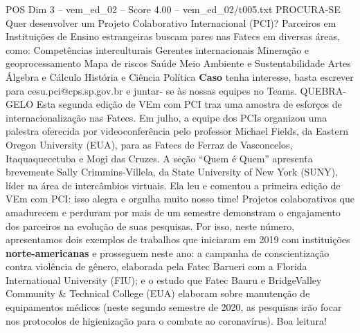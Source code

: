 \begin{textsample}{POS Dim 3 – vem\_ed\_02 – Score 4.00 – vem\_ed\_02/t005.txt}  \label{ex:f3_pos_143}
PROCURA-SE Quer desenvolver um Projeto Colaborativo Internacional (PCI)?
Parceiros em Instituições de Ensino estrangeiras buscam pares nas Fatecs em diversas áreas, como: Competências interculturais Gerentes internacionais Mineração e geoprocessamento Mapa de riscos Saúde Meio Ambiente e Sustentabilidade Artes Álgebra e Cálculo História e Ciência Política \textbf{Caso} tenha interesse, basta escrever para cesu.pci@cps.sp.gov.br e juntar- se às nossas equipes no Teams.
QUEBRA-GELO Esta segunda edição de VEm com PCI traz uma amostra de esforços de internacionalização nas Fatecs.
Em julho, a equipe dos PCIs organizou uma palestra oferecida por videoconferência pelo professor Michael Fields, da Eastern Oregon University (EUA), para as Fatecs de Ferraz de Vasconcelos, Itaquaquecetuba e Mogi das Cruzes.
A seção “Quem é Quem” apresenta brevemente Sally Crimmins-Villela, da State University of New York (SUNY), líder na área de intercâmbios virtuais.
Ela leu e comentou a primeira edição de VEm com PCI: isso alegra e orgulha muito nosso time!
Projetos colaborativos que amadurecem e perduram por mais de um semestre demonstram o engajamento dos parceiros na evolução de suas pesquisas.
Por isso, neste número, apresentamos dois exemplos de trabalhos que iniciaram em 2019 com instituições \textbf{norte-americanas} e prosseguem neste ano: a campanha de conscientização contra violência de gênero, elaborada pela Fatec Barueri com a Florida International University (FIU); e o estudo que Fatec Bauru e BridgeValley Community \& Technical College (EUA) elaboram sobre manutenção de equipamentos médicos (neste segundo semestre de 2020, as pesquisas irão focar nos protocolos de higienização para o combate ao coronavírus).
Boa leitura!

\end{textsample}
